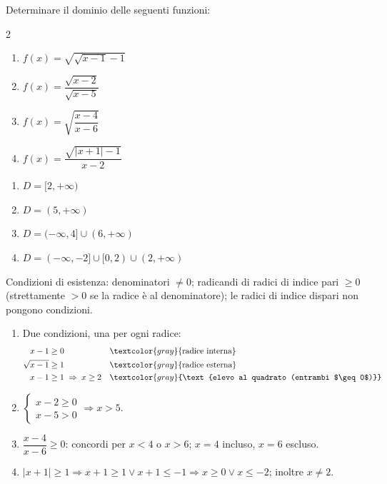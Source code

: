\begin{question}[ID=2.5, subtitle={Dominio di funzioni composte con radicali annidati}, difficulty=difficile, tags={dominio,funzioni composte,radicali}]
Determinare il dominio delle seguenti funzioni:

\begin{center}\begin{minipage}{0.92\linewidth}
\begin{multicols}{2}
\begin{enumerate}[leftmargin=3.2cm]
\item $f(x)=\sqrt{\sqrt{x-1}-1}$
\item $f(x)=\dfrac{\sqrt{x-2}}{\sqrt{x-5}}$
\item $f(x)=\sqrt{\dfrac{x-4}{x-6}}$
\item $f(x)=\dfrac{\sqrt{|x+1|-1}}{x-2}$
\end{enumerate}
\end{multicols}
\end{minipage}\end{center}
\begin{solution}
\begin{enumerate}
    \item $D=[2,+\infty)$
    \item $D=(5,+\infty)$
    \item $D=(-\infty,4]\cup(6,+\infty)$
    \item $D=(-\infty,-2]\cup[0,2)\cup(2,+\infty)$
\end{enumerate}
\end{solution}
\begin{explanation}
Condizioni di esistenza: denominatori $\neq0$; radicandi di radici di indice pari $\geq0$ (strettamente $>0$ se la radice è al denominatore); le radici di indice dispari non pongono condizioni.
\begin{enumerate}
    \item Due condizioni, una per ogni radice:
    \[\begin{aligned}
    x-1 &\geq 0 && \textcolor{gray}{\text{radice interna}}\\
    \sqrt{x-1} &\geq 1 && \textcolor{gray}{\text{radice esterna}}\\
    x-1 &\geq 1 \;\Rightarrow\; x\geq2 && \textcolor{gray}{\text{elevo al quadrato (entrambi $\geq0$)}}
    \end{aligned}\]
    \item $\begin{cases} x-2\geq0\\ x-5>0\end{cases} \Rightarrow x>5$.
    \item $\dfrac{x-4}{x-6}\geq0$: concordi per $x<4$ o $x>6$; $x=4$ incluso, $x=6$ escluso.
    \item $|x+1|\geq1 \Rightarrow x+1\geq1 \vee x+1\leq-1 \Rightarrow x\geq0 \vee x\leq-2$; inoltre $x\neq2$.
\end{enumerate}
\end{explanation}
\end{question}

